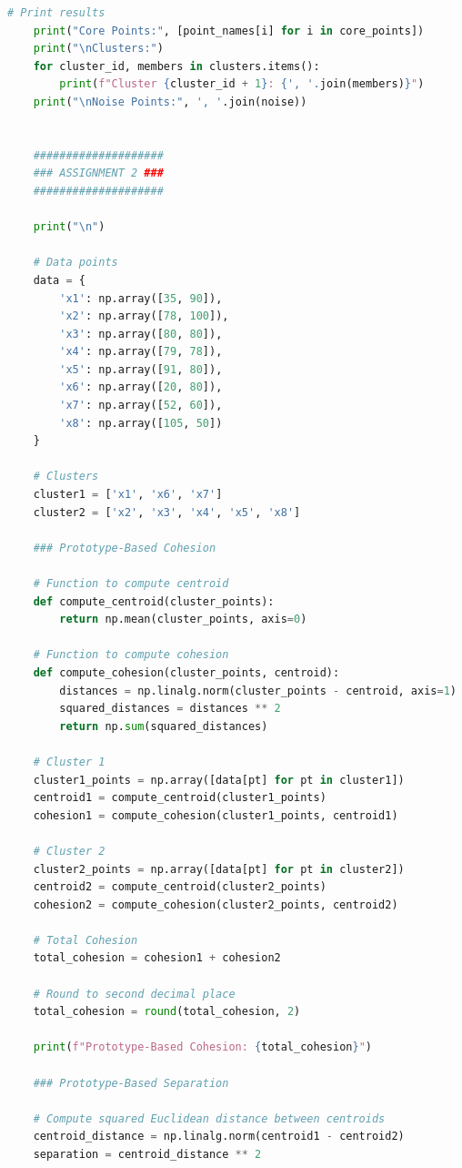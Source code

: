 \documentclass{article}
\begin{document}
\begin{lstlisting}[language=python]
    # Print results
    print("Core Points:", [point_names[i] for i in core_points])
    print("\nClusters:")
    for cluster_id, members in clusters.items():
        print(f"Cluster {cluster_id + 1}: {', '.join(members)}")
    print("\nNoise Points:", ', '.join(noise))
    
    
    ####################
    ### ASSIGNMENT 2 ###
    ####################
    
    print("\n")
    
    # Data points
    data = {
        'x1': np.array([35, 90]),
        'x2': np.array([78, 100]),
        'x3': np.array([80, 80]),
        'x4': np.array([79, 78]),
        'x5': np.array([91, 80]),
        'x6': np.array([20, 80]),
        'x7': np.array([52, 60]),
        'x8': np.array([105, 50])
    }
    
    # Clusters
    cluster1 = ['x1', 'x6', 'x7']
    cluster2 = ['x2', 'x3', 'x4', 'x5', 'x8']
    
    ### Prototype-Based Cohesion
    
    # Function to compute centroid
    def compute_centroid(cluster_points):
        return np.mean(cluster_points, axis=0)
    
    # Function to compute cohesion
    def compute_cohesion(cluster_points, centroid):
        distances = np.linalg.norm(cluster_points - centroid, axis=1)
        squared_distances = distances ** 2
        return np.sum(squared_distances)
    
    # Cluster 1
    cluster1_points = np.array([data[pt] for pt in cluster1])
    centroid1 = compute_centroid(cluster1_points)
    cohesion1 = compute_cohesion(cluster1_points, centroid1)
    
    # Cluster 2
    cluster2_points = np.array([data[pt] for pt in cluster2])
    centroid2 = compute_centroid(cluster2_points)
    cohesion2 = compute_cohesion(cluster2_points, centroid2)
    
    # Total Cohesion
    total_cohesion = cohesion1 + cohesion2
    
    # Round to second decimal place
    total_cohesion = round(total_cohesion, 2)
    
    print(f"Prototype-Based Cohesion: {total_cohesion}")
    
    ### Prototype-Based Separation
    
    # Compute squared Euclidean distance between centroids
    centroid_distance = np.linalg.norm(centroid1 - centroid2)
    separation = centroid_distance ** 2
    

\end{lstlisting}
\end{document}
